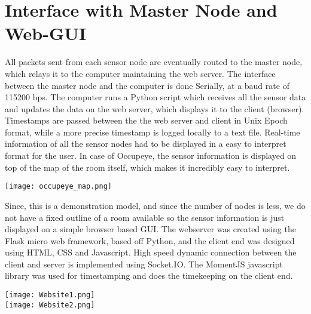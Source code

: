 \section{Interface with Master Node and Web-GUI}
All packets sent from each sensor node are eventually routed to the master node, which relays it to the computer maintaining the web server. The interface between the master node and the computer is done Serially, at a baud rate of 115200 bps. The computer runs a Python script which receives all the sensor data and updates the data on the web server, which displays it to the client (browser). Timestamps are passed between the the web server and client in Unix Epoch format, while a more precise timestamp is logged locally to a text file. 
Real-time information of all the sensor nodes had to be displayed in a easy to interpret format for the user. In case of Occupeye, the sensor information is displayed on top of the map of the room itself, which makes it incredibly easy to interpret. 
\begin{center}
	\texttt{[image: occupeye\_map.png]}
\end{center}
Since, this is a demonstration model, and since the number of nodes is less, we do not have a fixed outline of a room available so the sensor information is just displayed on a simple browser based GUI.
The webserver was created using the Flask micro web framework, based off Python, and the client end was designed using HTML, CSS and Javascript. High speed dynamic connection between the client and server is implemented using Socket.IO. The MomentJS javascript library was used for timestamping and does the timekeeping on the client end.

\begin{center}
	\texttt{[image: Website1.png]}
	\\
	\texttt{[image: Website2.png]}
\end{center}

